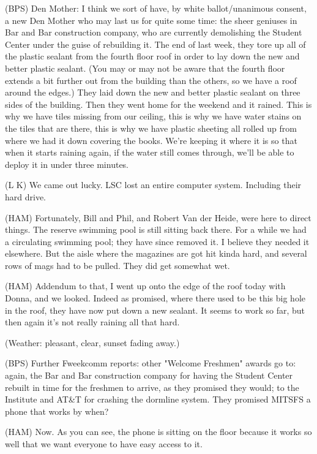 \documentclass[12pt]{article}
\begin{document}
(BPS) Den Mother: I think we sort of have, by white ballot/unanimous consent, a new Den Mother who may last us for quite some time: the sheer geniuses in Bar and Bar construction company, who are currently demolishing the Student Center under the guise of rebuilding it. The end of last week, they tore up all of the plastic sealant from the fourth floor roof in order to lay down the new and better plastic sealant. (You may or may not be aware that the fourth floor extends a bit further out from the building than the others, so we have a roof around the edges.) They laid down the new and better plastic sealant on three sides of the building. Then they went home for the weekend and it rained. This is why we have tiles missing from our ceiling, this is why we have water stains on the tiles that are there, this is why we have plastic sheeting all rolled up from where we had it down covering the books. We're keeping it where it is so that when it starts raining again, if the water still comes through, we'll be able to deploy it in under three minutes.

(L K) We came out lucky. LSC lost an entire computer system. Including their hard drive.

(HAM) Fortunately, Bill and Phil, and Robert Van der Heide, were here to direct things. The reserve swimming pool is still sitting back there. For a while we had a circulating swimming pool; they have since removed it. I believe they needed it elsewhere. But the aisle where the magazines are got hit kinda hard, and several rows of mags had to be pulled. They did get somewhat wet.

(HAM) Addendum to that, I went up onto the edge of the roof today with Donna, and we looked. Indeed as promised, where there used to be this big hole in the roof, they have now put down a new sealant. It seems to work so far, but then again it's not really raining all that hard.

(Weather: pleasant, clear, sunset fading away.)

(BPS) Further Fweekcomm reports: other "Welcome Freshmen" awards go to: again, the Bar and Bar construction company for having the Student Center rebuilt in time for the freshmen to arrive, as they promised they would; to the Institute and AT&T for crashing the dormline system. They promised MITSFS a phone that works by when?

(HAM) Now. As you can see, the phone is sitting on the floor because it works so well that we want everyone to have easy access to it.
\end{document}
